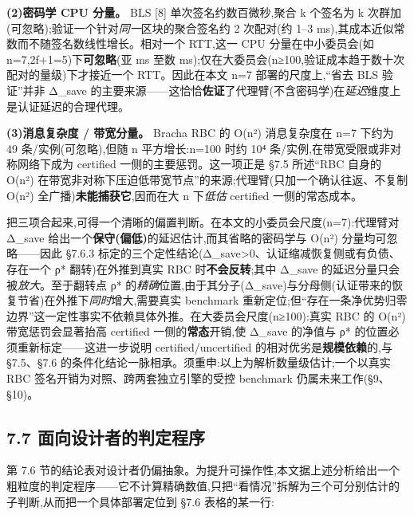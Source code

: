 \documentclass[UTF8,fontset=windows,a4paper,11pt]{ctexart}
\begin{document}
\textbf{(2)密码学 CPU 分量。} BLS {[}8{]} 单次签名约数百微秒,聚合 k 个签名为 k 次群加(可忽略);验证一个针对\emph{同一}区块的聚合签名约
2 次配对(约 1--3 ms),其成本近似常数而不随签名数线性增长。相对一个
RTT,这一 CPU 分量在中小委员会(如 n=7,2f+1=5)下\textbf{可忽略}(亚 ms
至数 ms);仅在大委员会(n≥100,验证成本趋于数十次配对的量级)下才接近一个
RTT。因此在本文 n=7 部署的尺度上,``省去 BLS 验证''并非 Δ\_save
的主要来源------这恰恰\textbf{佐证}了代理臂(不含密码学)在\emph{延迟}维度上是认证延迟的合理代理。

\textbf{(3)消息复杂度 / 带宽分量。} Bracha RBC 的 O(n²)
消息复杂度在 n=7 下约为 49 条/实例(可忽略),但随 n
平方增长:n=100 时约 10⁴
条/实例,在带宽受限或非对称网络下成为 certified 一侧的主要惩罚。这一项正是
§7.5 所述``RBC 自身的 O(n²)
在带宽非对称下压迫低带宽节点''的来源;代理臂(只加一个确认往返、不复制
O(n²) 全广播)\textbf{未能捕获它},因而在大 n 下\emph{低估} certified 一侧的常态成本。

把三项合起来,可得一个清晰的偏置判断。在本文的小委员会尺度(n=7):代理臂对
Δ\_save 给出一个\textbf{保守(偏低)}的延迟估计,而其省略的密码学与 O(n²)
分量均可忽略------因此 §7.6.3 标定的三个定性结论(Δ\_save\textgreater0、认证缩减恢复侧或有负债、存在一个
ρ* 翻转)在外推到真实 RBC 时\textbf{不会反转};其中 Δ\_save
的延迟分量只会被\emph{放大}。至于翻转点 ρ* 的\emph{精确}位置,由于其分子(Δ\_save)与分母侧(认证带来的恢复节省)在外推下\emph{同时}增大,需要真实
benchmark 重新定位;但``存在一条净优势归零边界''这一定性事实不依赖具体外推。在大委员会尺度(n≥100):真实
RBC 的 O(n²)
带宽惩罚会显著抬高 certified 一侧的\textbf{常态}开销,使 Δ\_save 的净值与
ρ*
的位置必须重新标定------这进一步说明 certified/uncertified 的相对优劣是\textbf{规模依赖}的,与
§7.5、§7.6 的条件化结论一脉相承。须重申:以上为解析数量级估计;一个以真实
RBC 签名开销为对照、跨两套独立引擎的受控 benchmark 仍属未来工作(§9、§10)。

\subsection{7.7
面向设计者的判定程序}\label{ux9762ux5411ux8bbeux8ba1ux8005ux7684ux5224ux5b9aux7a0bux5e8f}

第 7.6
节的结论表对设计者仍偏抽象。为提升可操作性,本文据上述分析给出一个粗粒度的判定程序------它不计算精确数值,只把``看情况''拆解为三个可分别估计的子判断,从而把一个具体部署定位到
§7.6 表格的某一行:
\end{document}
